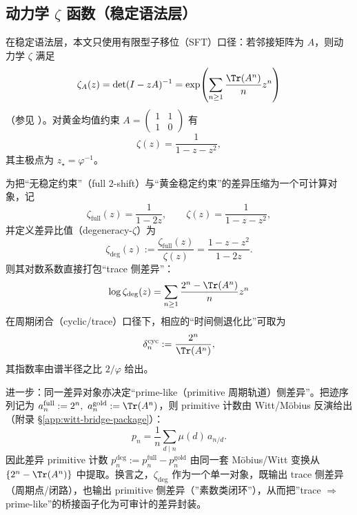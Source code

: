 \subsection{动力学 \texorpdfstring{$\zeta$}{zeta} 函数（稳定语法层）}\label{subsec:zeta-syntax-zeta}

在稳定语法层，本文只使用有限型子移位（SFT）口径：若邻接矩阵为 $A$，则动力学 $\zeta$ 满足
\[
\zeta_A(z)=\det(I-zA)^{-1}
=\exp\!\left(\sum_{n\ge 1}\frac{\Tr(A^n)}{n}z^n\right)
\]
（参见 \cite{LindMarcus1995}）。对黄金均值约束
\(
A=\begin{pmatrix}1&1\\1&0\end{pmatrix}
\)
有
\[
\zeta(z)=\frac{1}{1-z-z^2},
\]
其主极点为 $z_\star=\varphi^{-1}$。

\begin{remark}\label{rem:degeneracy-zeta-bridge}
为把“无稳定约束”（full $2$-shift）与“黄金稳定约束”的差异压缩为一个可计算对象，记
\[
\zeta_{\mathrm{full}}(z)=\frac{1}{1-2z},
\qquad
\zeta(z)=\frac{1}{1-z-z^2},
\]
并定义差异比值（degeneracy-$\zeta$）为
\[
\zeta_{\mathrm{deg}}(z):=\frac{\zeta_{\mathrm{full}}(z)}{\zeta(z)}
=\frac{1-z-z^2}{1-2z}.
\]
则其对数系数直接打包“trace 侧差异”：
\[
\log \zeta_{\mathrm{deg}}(z)
=\sum_{n\ge 1}\frac{2^n-\Tr(A^n)}{n}z^n
\]
在周期闭合（cyclic/trace）口径下，相应的“时间侧退化比”可取为
\[
\delta_n^{\mathrm{cyc}}:=\frac{2^n}{\Tr(A^n)},
\]
其指数率由谱半径之比 \(2/\varphi\) 给出。

进一步：同一差异对象亦决定“prime-like（primitive 周期轨道）侧差异”。把迹序列记为
\(
a_n^{\mathrm{full}}:=2^n,\ a_n^{\mathrm{gold}}:=\Tr(A^n)
\)，则 primitive 计数由 Witt/Möbius 反演给出（附录 \S\ref{app:witt-bridge-package}）：
\[
p_n=\frac{1}{n}\sum_{d\mid n}\mu(d)\,a_{n/d}.
\]
因此差异 primitive 计数
\(
p_n^{\mathrm{deg}}:=p_n^{\mathrm{full}}-p_n^{\mathrm{gold}}
\)
由同一套 Möbius/Witt 变换从 \(\{2^n-\Tr(A^n)\}\) 中提取。换言之，\(\zeta_{\mathrm{deg}}\) 作为一个单一对象，既输出 trace 侧差异（周期点/闭路），也输出 primitive 侧差异（”素数类闭环”），从而把”trace \(\Rightarrow\) prime-like”的桥接函子化为可审计的差异封装。
\end{remark}

